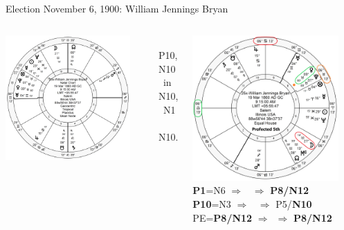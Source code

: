 \begin{frame}[t]{Election November 6, 1900: William Jennings Bryan}
\small
\begin{columns}[T, onlytextwidth]
\vspace{-1em}
{\includegraphics[width=0.9\textwidth]{charts/Bryan.png}}
\fontsize{8pt}{9pt}\selectfont

\Venus\, \Sextile\, P10, N10 \\
\Moon\, in N10, \Trine\, N1 \\
\Saturn\, \Opposition\, N10.

\vspace{-1em}
{\includegraphics[width=0.9\textwidth]{charts/Bryan-Prof-5th.png}}
\textbf{\dgreen P1}=N6 
	$\Rightarrow$ \Venus\, $\Rightarrow$ \textbf{\dgreen P8/N12}\\
\textbf{\red P10}=N3
	$\Rightarrow$ \Moon\, $\Rightarrow$ P5/\textbf{\red N10}\\
PE=\textbf{\dgreen P8/N12}
	$\Rightarrow$ \Saturn\,\Retrograde $\Rightarrow$ \textbf{\dgreen P8/N12}


\end{columns}
\end{frame}
